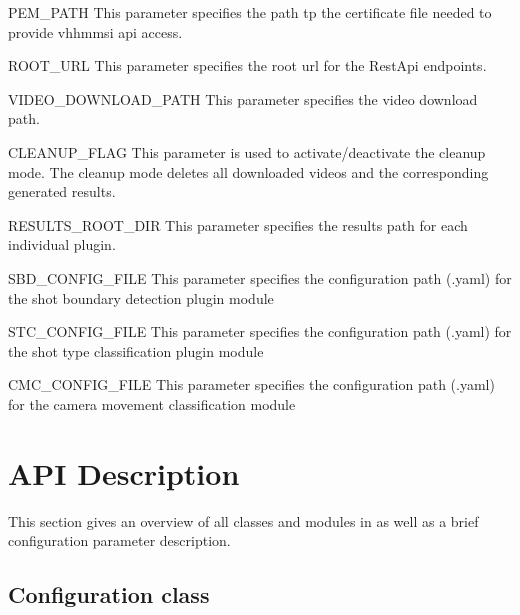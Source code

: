 \documentclass[letterpaper,10pt,english,openany,oneside]{sphinxmanual}
\begin{document}
PEM\_PATH
This parameter specifies the path tp the certificate file needed to provide vhh\sphinxhyphen{}mmsi api access.



ROOT\_URL
This parameter specifies the root url for the RestApi endpoints.



VIDEO\_DOWNLOAD\_PATH
This parameter specifies the video download path.



CLEANUP\_FLAG
This parameter is used to activate/deactivate the clean\sphinxhyphen{}up mode. The clean\sphinxhyphen{}up mode deletes all downloaded videos and the corresponding generated results.



RESULTS\_ROOT\_DIR
This parameter specifies the results path for each individual plugin.



SBD\_CONFIG\_FILE
This parameter specifies the configuration path (.yaml) for the shot boundary detection plugin module



STC\_CONFIG\_FILE
This parameter specifies the configuration path (.yaml) for the shot type classification plugin module



CMC\_CONFIG\_FILE
This parameter specifies the configuration path (.yaml) for the camera movement classification module




\chapter{API Description}
\label{\detokenize{index:api-description}}
This section gives an overview of all classes and modules in  as well as a brief configuration parameter description.


\section{Configuration class}
\label{\detokenize{Configuration:configuration-class}}\label{\detokenize{Configuration::doc}}
\end{document}

